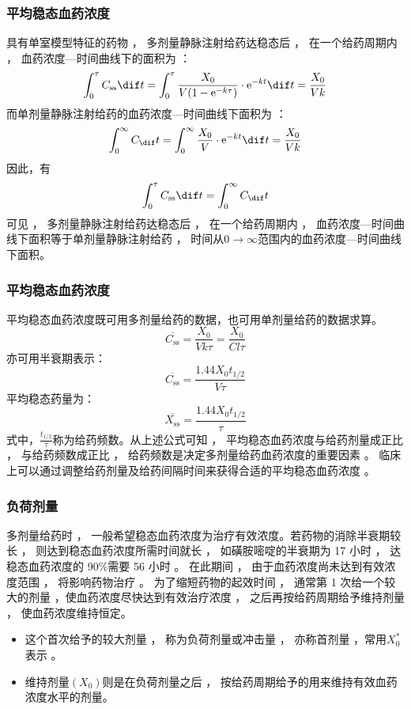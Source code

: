 \documentclass[dvipsnames, svgnames, x11names]{beamer}
\begin{document}
\begin{frame}
	\frametitle{平均稳态血药浓度}
	具有单室模型特征的药物 ， 多剂量静脉注射给药达稳态后 ， 在一个给药周期内 ， 血药浓度---时间曲线下的面积为 ：
	\[
		\int_0^\tau C_\mathrm{ss}\dif t = \int_0^\tau \frac{X_0}{V(1-\mathrm{e}^{-k\tau})}\cdot \mathrm{e}^{-kt} \dif t = \frac{X_0}{Vk}
	\]
	而单剂量静脉注射给药的血药浓度---时间曲线下面积为 ：
	\[
		\int_0^\infty C_\mathrm \dif t = \int_0^\infty \frac{X_0}{V}\cdot \mathrm{e}^{-kt} \dif t = \frac{X_0}{Vk}
	\]
	因此，有
	\[
		\int_0^\tau C_\mathrm{ss}\dif t = \int_0^\infty C_\mathrm \dif t
	\]
	可见 ， 多剂量静脉注射给药达稳态后 ， 在一个给药周期内 ， 血药浓度---时间曲线下面积等于单剂量静脉注射给药 ， 时间从$0\to \infty$范围内的血药浓度---时间曲线下面积。
\end{frame}



\begin{frame}
	\frametitle{平均稳态血药浓度}
	平均稳态血药浓度既可用多剂量给药的数据，也可用单剂量给药的数据求算。
	\[
		\overline{C_\mathrm{ss}} = \frac{X_0}{Vk\tau} = \frac{X_0}{Cl\tau}
	\]
	亦可用半衰期表示：
	\[
		\overline{C_\mathrm{ss}} = \frac{1.44X_0t_{1/2}}{V\tau}
	\]
	平均稳态药量为：
	\[
		\overline{X_\mathrm{ss}} = \frac{1.44X_0t_{1/2}}{\tau}
	\]
	式中，$\frac{t_{1/2}}{\tau}$称为给药频数。从上述公式可知 ， 平均稳态血药浓度与给药剂量成正比 ， 与给药频数成正比 ， 给药频数是决定多剂量给药血药浓度的重要因素 。 临床上可以通过调整给药剂量及给药间隔时间来获得合适的平均稳态血药浓度 。
\end{frame}


\begin{frame}
	\frametitle{负荷剂量}
	多剂量给药时 ， 一般希望稳态血药浓度为治疗有效浓度。若药物的消除半衰期较长 ， 则达到稳态血药浓度所需时间就长 ， 如磺胺嘧啶的半衰期为 17 小时 ， 达稳态血药浓度的 90\%需要 56 小时 。 在此期间 ， 由于血药浓度尚未达到有效浓度范围 ， 将影响药物治疗 。 为了缩短药物的起效时间 ， 通常第 1 次给一个较大的剂量 ，使血药浓度尽快达到有效治疗浓度 ， 之后再按给药周期给予维持剂量 ， 使血药浓度维持恒定。
	\begin{itemize}
	  \item 这个首次给予的较大剂量 ， 称为负荷剂量或冲击量 ， 亦称首剂量 ，常用$X_0^*$表示 。
	  \item 维持剂量$(X_0)$则是在负荷剂量之后 ， 按给药周期给予的用来维持有效血药浓度水平的剂量。
	\end{itemize}
	 
\end{frame}
\end{document}
